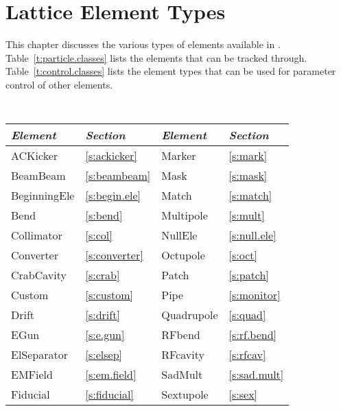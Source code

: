 \chapter{Lattice Element Types}
\label{c:element-list}


This chapter discusses the various types of elements
available in \bmadjl.
Table~\ref{t:particle.classes} lists the elements that can be tracked through.
Table~\ref{t:control.classes} lists the  element types that can be used for parameter
control of other elements. 

\begin{table}[htb]
\centering
{\tt
\begin{tabular}{llll} \toprule
  {\it Element}    & {\it Section}         & {\it Element}      & {\it Section}       \\ \midrule
  ACKicker         & \ref{s:ackicker}      &  Marker            & \ref{s:mark}        \\
  BeamBeam         & \ref{s:beambeam}      &  Mask              & \ref{s:mask}        \\
  BeginningEle     & \ref{s:begin.ele}     &  Match             & \ref{s:match}       \\
  Bend             & \ref{s:bend}          &  Multipole         & \ref{s:mult}        \\
  Collimator       & \ref{s:col}           &  NullEle           & \ref{s:null.ele}    \\
  Converter        & \ref{s:converter}     &  Octupole          & \ref{s:oct}         \\
  CrabCavity       & \ref{s:crab}          &  Patch             & \ref{s:patch}       \\
  Custom           & \ref{s:custom}        &  Pipe              & \ref{s:monitor}     \\  
  Drift            & \ref{s:drift}         &  Quadrupole        & \ref{s:quad}        \\
  EGun             & \ref{s:e.gun}         &  RFbend            & \ref{s:rf.bend}     \\
  ElSeparator      & \ref{s:elsep}         &  RFcavity          & \ref{s:rfcav}       \\ 
  EMField          & \ref{s:em.field}      &  SadMult           & \ref{s:sad.mult}    \\
  Fiducial         & \ref{s:fiducial}      &  Sextupole         & \ref{s:sex}         \\

\end{tabular}}
\end{table}
